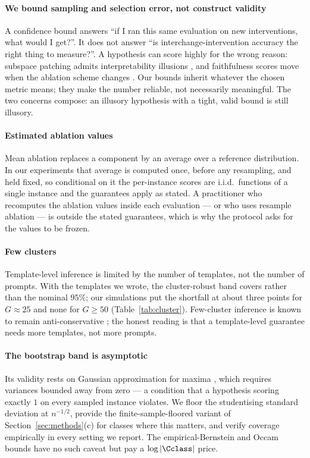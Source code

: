 \paragraph{We bound sampling and selection error, not construct validity}
A confidence bound answers ``if I ran this same evaluation on new interventions,
what would I get?''. It does not answer ``is interchange-intervention accuracy
the right thing to measure?''. A hypothesis can score highly for the wrong
reason: subspace patching admits interpretability illusions
\citep{makelov2024subspace}, and faithfulness scores move when the ablation
scheme changes \citep{miller2024faithfulness,zhang2024bestpractices}. Our bounds
inherit whatever the chosen metric means; they make the number reliable, not
necessarily meaningful. The two concerns compose: an illusory hypothesis with a
tight, valid bound is still illusory.

\paragraph{Estimated ablation values}
Mean ablation replaces a component by an average over a reference distribution.
In our experiments that average is computed once, before any resampling, and held
fixed, so conditional on it the per-instance scores are i.i.d.\ functions of a
single instance and the guarantees apply as stated. A practitioner who recomputes
the ablation values inside each evaluation --- or who uses resample ablation ---
is outside the stated guarantees, which is why the protocol asks for the values to
be frozen.

\paragraph{Few clusters}
Template-level inference is limited by the number of templates, not the number of
prompts. With the \MyIOINTemplates{} templates we wrote, the cluster-robust band
covers \MyClusterClusterCov{} rather than the nominal $95\%$; our simulations put
the shortfall at about three points for $G\approx 25$ and none for $G\ge 50$
(Table~\ref{tab:cluster}). Few-cluster inference is known to remain
anti-conservative \citep{mnw2023clusterrobust}; the honest reading is that a
template-level guarantee needs more templates, not more prompts.

\paragraph{The bootstrap band is asymptotic}
Its validity rests on Gaussian approximation for maxima
\citep{chernozhukov2013gaussian,cck2019moment}, which requires variances bounded
away from zero --- a condition that a hypothesis scoring exactly $1$ on every
sampled instance violates. We floor the studentising standard deviation at
$n^{-1/2}$, provide the finite-sample-floored variant of
Section~\ref{sec:methods}(c) for classes where this matters, and verify coverage
empirically in every setting we report. The empirical-Bernstein and Occam bounds
have no such caveat but pay a $\log|\Cclass|$ price.

